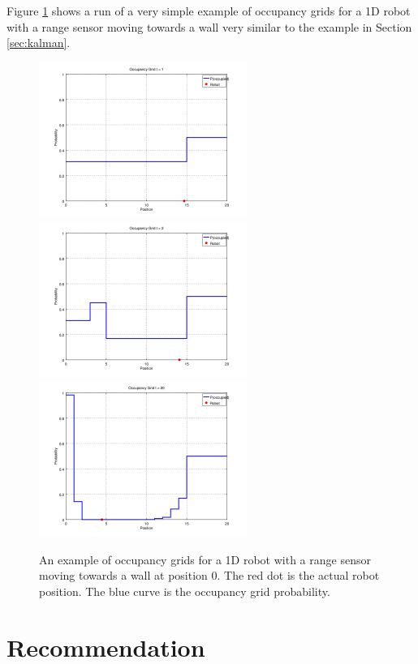 \documentclass{article}
\begin{document}
Figure \ref{fig:occupgrid} shows a run of a very simple example of occupancy grids for a 1D robot with a range sensor moving towards a wall very similar to the example in Section \ref{sec:kalman}.

\begin{figure}
\includegraphics[width=\linewidth,height=2in]{occupgrid/occupgrid1.png}
\includegraphics[width=\linewidth,height=2in]{occupgrid/occupgrid2.png}
\includegraphics[width=\linewidth,height=2in]{occupgrid/occupgrid20.png}
\caption{An example of occupancy grids for a 1D robot with a range sensor moving towards a wall at position 0.  The red dot is the actual robot position.  The blue curve is the occupancy grid probability.}
\label{fig:occupgrid}
\end{figure}

\section{Recommendation}
\end{document}
